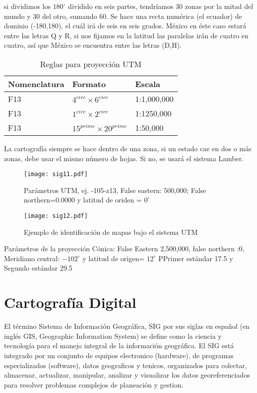 si dividimos los $180^{\circ}$ dividido en seis partes, tendríamos 30 zonas por la mitad del mundo y 30 del otro, sumando 60.
Se hace una recta numérica (el ecuador) de dominio (-180,180), el cuál irá de seis en seis grados. México en éste caso estará entre las letras Q y R, si nos fijamos en la latitud  las paralelas irán de cuatro en cuatro, así que México se encuentra entre las letras (D,H).
\begin{table}[h!]
    \centering
        \begin{tabular}{@{}lll@{}}
        \toprule
        Nomenclatura & Formato                       & Escala      \\ \midrule
        F13          & $4^{circ}\times 6^{circ}$     & 1:1,000,000 \\
        F13          & $1^{circ}\times 2^{circ}$     & 1:1250,000  \\
        F13          & $15^{prime}\times 20^{prime}$ & 1:50,000    \\ \bottomrule
        \end{tabular}
        \caption{Reglas para proyección UTM}
        \label{tabsig}
\end{table}
La cartografía siempre se hace dentro de una zona, si un estado cae en dos o más zonas, debe usar el mismo número de hojas. Si no, se usará el sistema Lamber.
\begin{figure}[h!]
\centering
  \texttt{[image: sig11.pdf]}
  \caption{Parámetros UTM, ej. -105-z13, False eastern: 500,000; False northern=0.0000 y latitud de oriden = $0^{\circ}$}
  \label{sig11}
\end{figure}
\begin{figure}[h!]
\centering
  \texttt{[image: sig12.pdf]}
  \caption{Ejemplo de identificación de mapas bajo el sistema UTM}
  \label{sig12}
\end{figure}

Parámetros de la proyección Cónica:
False Eastern 2,500,000, false northern :0, Meridiano central: $-102^{\circ}$ y latitud de origen= $12^{\circ}$ PPrimer estándar 17.5 y Segundo estándar 29.5








\section{Cartografía Digital}
El término Sistema de Información Geográfica, SIG por sus siglas en español (en inglés GIS, Geographic Information System) se define como la ciencia y tecnología para el manejo integral de la información geográfica. El SIG está integrado por un conjunto de equipos electronico (hardware), de programas especializados (software), datos geograficos y tenicos, organizados para colectar, almacenar, actualizar, manipular, analizar y visualizar los datos georeferenciados para resolver problemas complejos de planeación y gestion. 

